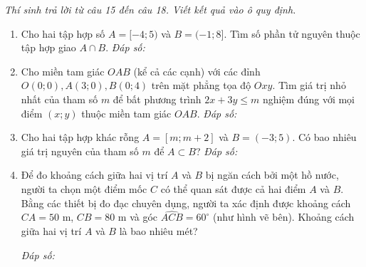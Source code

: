 \documentclass[12pt,a4paper]{article}
\newcommand{\parttitle}[1]{\par\vspace{2pt}\nopagebreak{\large\bfseries\color{ink}#1}\par\nopagebreak\vspace{1pt}}
\newcommand{\answerbox}{\hfill\textit{Đáp số:}\ \fbox{\rule{0pt}{12pt}\hspace{2.2cm}}}
\begin{document}
\parttitle{PHẦN III. Trắc nghiệm trả lời ngắn}
\textit{Thí sinh trả lời từ câu 15 đến câu 18. Viết kết quả vào ô quy định.}
\begin{enumerate}[resume]
\item Cho hai tập hợp số $A = [-4; 5)$ và $B = (-1; 8]$. Tìm số phần tử nguyên thuộc tập hợp giao $A \cap B$.
\answerbox

\item Cho miền tam giác $OAB$ (kể cả các cạnh) với các đỉnh $O(0; 0), A(3; 0), B(0; 4)$ trên mặt phẳng tọa độ $Oxy$. Tìm giá trị nhỏ nhất của tham số $m$ để bất phương trình $2x + 3y \le m$ nghiệm đúng với mọi điểm $(x; y)$ thuộc miền tam giác $OAB$.
\answerbox

\item Cho hai tập hợp khác rỗng $A = [m; m + 2]$ và $B = (-3; 5)$. Có bao nhiêu giá trị nguyên của tham số $m$ để $A \subset B$?
\answerbox

\item \begin{minipage}[t]{0.62\linewidth}
Để đo khoảng cách giữa hai vị trí $A$ và $B$ bị ngăn cách bởi một hồ nước, người ta chọn một điểm mốc $C$ có thể quan sát được cả hai điểm $A$ và $B$. Bằng các thiết bị đo đạc chuyên dụng, người ta xác định được khoảng cách $CA = 50\text{ m}$, $CB = 80\text{ m}$ và góc $\widehat{ACB} = 60^\circ$ (như hình vẽ bên). Khoảng cách giữa hai vị trí $A$ và $B$ là bao nhiêu mét?
\vspace{6pt}

\answerbox
\end{minipage}%
\hfill
\begin{minipage}[t]{0.35\linewidth}
\centering
{}
\end{minipage}
\end{enumerate}
\end{document}

